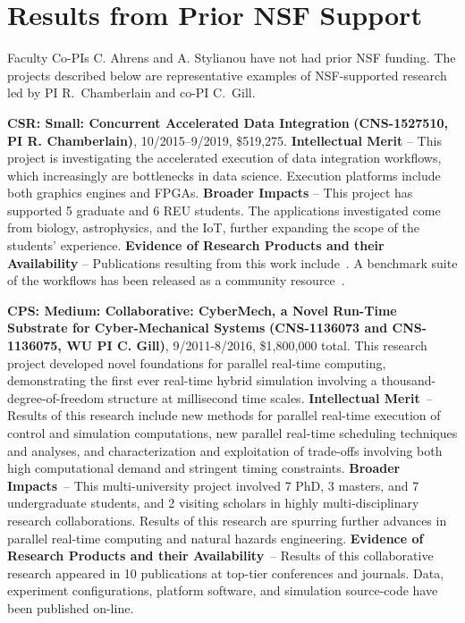 \section{Results from Prior NSF Support}
\label{sec:prior}

Faculty Co-PIs C. Ahrens and A. Stylianou have not had prior NSF funding.
The projects described
below are representative examples of NSF-supported research led by PI 
R.~Chamberlain and co-PI C.~Gill.

{\bf CSR: Small: Concurrent Accelerated Data Integration}
{\bf (CNS-1527510,
PI R. Chamberlain)}, 
10/2015--9/2019, \$519,275.  
%
\textbf{Intellectual Merit} -- This project is investigating the
accelerated execution of data integration workflows, which
increasingly are bottlenecks in data science. Execution platforms
include both graphics engines and FPGAs.
%
\textbf{Broader Impacts} -- This project has supported 5
graduate and 6 REU students.  The applications investigated
come from biology, astrophysics, and the IoT,
further expanding the scope of the students'
experience.
%
\textbf{Evidence of Research Products and their Availability} --
Publications resulting from this work include~\cite{cc19,dibs,c17,fcbmc19,mgc16,js16}.
A benchmark suite of the workflows has been released
as a community resource~\cite{dibsv1}.

{\bf CPS: Medium: Collaborative: CyberMech, a Novel Run-Time Substrate for 
Cyber-Mechanical Systems}
{\bf (CNS-1136073 and CNS-1136075,
WU PI C. Gill)}, 9/2011-8/2016, \$1,800,000 total.  
%
This research project developed novel foundations for parallel real-time computing, demonstrating the first ever real-time hybrid simulation involving a thousand-degree-of-freedom structure at millisecond time scales.
%
\textbf{Intellectual Merit}~-- Results of this research include new methods for parallel real-time execution of control and simulation computations, new parallel real-time scheduling techniques and analyses, and characterization and exploitation of trade-offs involving both high computational demand and stringent timing constraints.
%
\textbf{Broader Impacts}~-- This multi-university project involved 7 PhD, 3 masters, and 7 undergraduate students, and 2 visiting scholars in highly multi-disciplinary research collaborations.  Results of this research are spurring
further advances in parallel real-time computing and natural hazards
engineering.
%
\textbf{Evidence of Research Products and their Availability}~-- Results of
this 
collaborative research appeared in 10 publications at
top-tier conferences and journals.
Data, experiment configurations, platform software, and simulation source-code 
have been published on-line. %


